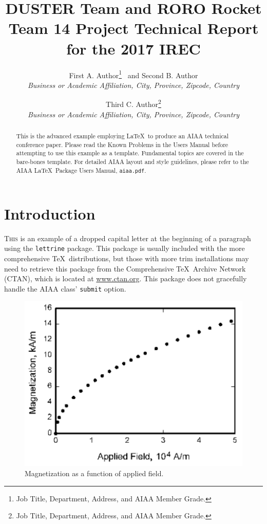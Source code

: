 \documentclass[]{aiaa-tc}%
\title{DUSTER Team and RORO Rocket \\  \small{Team 14 Project Technical Report for the 2017 IREC}
}
\author{
  First A. Author\thanks{Job Title, Department, Address, and AIAA Member Grade.}
  \ and Second B. Author\thanksibid{1}\\
  {\normalsize\itshape
   Business or Academic Affiliation, City, Province, Zipcode, Country}\\
  \and
  Third C. Author\thanks{Job Title, Department, Address,
                         and AIAA Member Grade.}\\
  {\normalsize\itshape
  Business or Academic Affiliation, City, Province, Zipcode, Country}
 }
\newcommand{\package}[1]{\texttt{#1}}
\newcommand{\file}[1]{\texttt{#1}}
\begin{document}
\maketitle

\begin{abstract}
This is the advanced example employing \LaTeX\ to produce an AIAA
technical conference paper.
Please read the Known Problems in the Users Manual before attempting
to use this example as a template.
Fundamental topics are covered in the bare-bones template.
For detailed AIAA layout and style guidelines, please refer to the AIAA
\LaTeX\ Package Users Manual, \file{aiaa.pdf}.
\end{abstract}

\printnomenclature
\section{Introduction}

\lettrine[nindent=0pt]{T}{his} is an example of a dropped capital letter
at the beginning of a paragraph using the \package{lettrine} package.
This package is usually included with the more comprehensive \TeX\
distributions, but those with more trim installations may need to
retrieve this package from the Comprehensive \TeX\ Archive Network
(CTAN), which is located at \href{http://www.ctan.org}{www.ctan.org}.
This package does not gracefully handle the AIAA class' \verb|submit|
option.


\begin{figure}
 \includegraphics{figure_magnet}
 \caption{Magnetization as a function of applied field.}
 \label{f:magnetic_field}
\end{figure}
\end{document}
